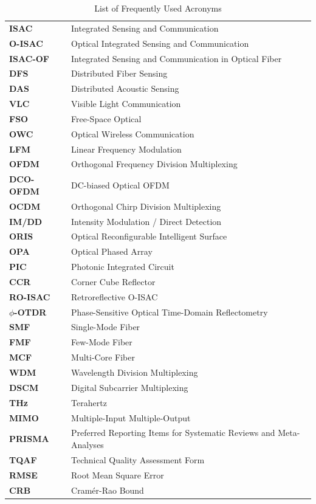 \begin{table}[htbp]
\caption{List of Frequently Used Acronyms}
\label{tab:acronyms}
\centering
\setlength{\tabcolsep}{4pt}
\renewcommand{\arraystretch}{1.08}
\begin{tabularx}{\textwidth}{@{}L{2.8cm}Y@{}}
\toprule
{} &  \\
\midrule
\textbf{ISAC} & Integrated Sensing and Communication \\
\textbf{O-ISAC} & Optical Integrated Sensing and Communication \\
\textbf{ISAC-OF} & Integrated Sensing and Communication in Optical Fiber \\
\textbf{DFS} & Distributed Fiber Sensing \\
\textbf{DAS} & Distributed Acoustic Sensing \\
\textbf{VLC} & Visible Light Communication \\
\textbf{FSO} & Free-Space Optical \\
\textbf{OWC} & Optical Wireless Communication \\
\textbf{LFM} & Linear Frequency Modulation \\
\textbf{OFDM} & Orthogonal Frequency Division Multiplexing \\
\textbf{DCO-OFDM} & DC-biased Optical OFDM \\
\textbf{OCDM} & Orthogonal Chirp Division Multiplexing \\
\textbf{IM/DD} & Intensity Modulation / Direct Detection \\
\textbf{ORIS} & Optical Reconfigurable Intelligent Surface \\
\textbf{OPA} & Optical Phased Array \\
\textbf{PIC} & Photonic Integrated Circuit \\
\textbf{CCR} & Corner Cube Reflector \\
\textbf{RO-ISAC} & Retroreflective O-ISAC \\
\textbf{$\phi$-OTDR} & Phase-Sensitive Optical Time-Domain Reflectometry \\
\textbf{SMF} & Single-Mode Fiber \\
\textbf{FMF} & Few-Mode Fiber \\
\textbf{MCF} & Multi-Core Fiber \\
\textbf{WDM} & Wavelength Division Multiplexing \\
\textbf{DSCM} & Digital Subcarrier Multiplexing \\
\textbf{THz} & Terahertz \\
\textbf{MIMO} & Multiple-Input Multiple-Output \\
\textbf{PRISMA} & Preferred Reporting Items for Systematic Reviews and Meta-Analyses \\
\textbf{TQAF} & Technical Quality Assessment Form \\
\textbf{RMSE} & Root Mean Square Error \\
\textbf{CRB} & Cram\'er-Rao Bound \\
\bottomrule
\end{tabularx}
\end{table}
